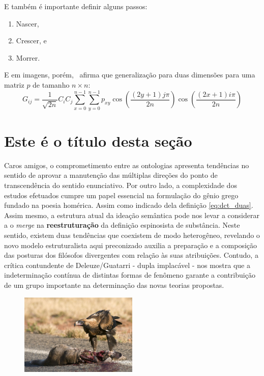 \documentclass[font=plain,chapter=TITLE,section=Title,espaco=duplo,tocpage=plain,appendix=Name,floatnumber=continuous]{abnt}
\begin{document}
E também é importante definir alguns passos:
\begin{enumerate}
  \item Nascer,
  \item Crescer, e
  \item Morrer.
\end{enumerate}

%
%
E em imagens, porém,~\cite{semolini2002support} afirma que generalização
para duas dimensões para uma matriz $p$ de tamanho $n \times n$:
\begin{equation}
G_{ij} = \frac{1}{\sqrt{2n}} C_i C_j \sum_{x=0}^{n-1} \sum_{y=0}^{n-1}
         p_{xy} \cos{ \left ( \frac{(2y + 1) j \pi}{2n} \right ) }
              \cos{ \left ( \frac{(2x + 1) i \pi}{2n} \right ) }
\label{eq:dct_duas}
\end{equation}

%
%
\section{Este é o título desta seção}

Caros amigos, o comprometimento entre as ontologias apresenta tendências no
sentido de aprovar a manutenção das múltiplas direções do ponto de
transcendência do sentido enunciativo. Por outro lado, a complexidade dos
estudos efetuados cumpre um papel essencial na formulação do gênio grego
fundado na poesia homérica. Assim como indicado dela definição
\ref{eq:dct_duas}.  Assim mesmo, a estrutura atual da ideação semântica
pode nos levar a considerar a o \textit{merge} na \textbf{reestruturação}
da definição espinosista de substância. Neste sentido, existem duas
tendências que coexistem de modo heterogêneo, revelando o novo modelo
estruturalista aqui preconizado auxilia a preparação e a composição das
posturas dos filósofos divergentes com relação às suas atribuições.
Contudo, a crítica contundente de Deleuze/Guatarri - dupla implacável - nos
mostra que a indeterminação contínua de distintas formas de fenômeno
garante a contribuição de um grupo importante na determinação das novas
teorias propostas.

%
%
%
%
\begin{figure}[h!]
  \centering
  \includegraphics[width=0.5\textwidth]{img/eagle.jpg}
\end{figure}
\end{document}
